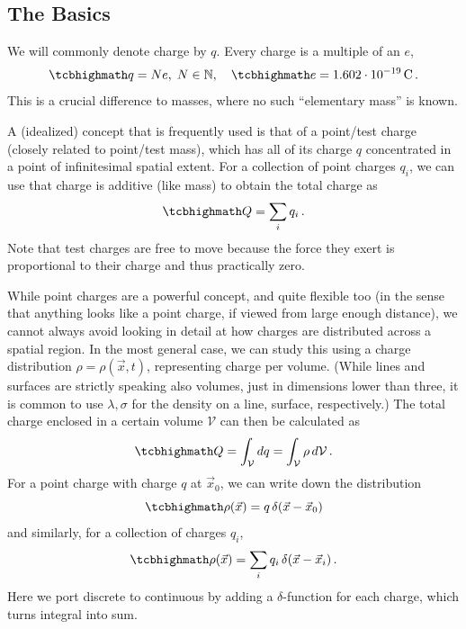 \documentclass[../class_mech_main.tex]{subfiles}
\begin{document}
        \subsection{The Basics}
We will commonly denote charge by $q$. Every charge is a multiple of an  $e$,
\begin{equation}
    \eqbox{
        q = N e
    }, \; N \in \mathbb{N}
    , \quad
    \eqbox{
        e = 1.602 \cdot 10^{-19} \, \unit{\coulomb}
    } \, .
\end{equation}
This is a crucial difference to masses, where no such \enquote{elementary mass} is known.

A (idealized) concept that is frequently used is that of a point/test charge (closely related to point/test mass), which has all of its charge $q$ concentrated in a point of infinitesimal spatial extent. For a collection of point charges $q_i$, we can use that charge is additive (like mass) to obtain the total charge as
\begin{equation}
    \eqbox{
        Q = \sum_i q_i
    } \, .
\end{equation}
Note that test charges are free to move because the force they exert is proportional to their charge and thus practically zero.

While point charges are a powerful concept, and quite flexible too (in the sense that anything looks like a point charge, if viewed from large enough distance), we cannot always avoid looking in detail at how charges are distributed across a spatial region. In the most general case, we can study this using a charge distribution $\rho = \rho(\vec{x}, t)$, representing charge per volume. (While lines and surfaces are strictly speaking also volumes, just in dimensions lower than three, it is common to use $\lambda, \sigma$ for the density on a line, surface, respectively.) The total charge enclosed in a certain volume $\mathcal{V}$ can then be calculated as
\begin{equation}
    \eqbox{
        Q = \int_\mathcal{V} dq = \int_\mathcal{V} \rho \, d\mathcal{V}
    } \, .
\end{equation}
For a point charge with charge $q$ at $\vec{x}_0$, we can write down the distribution
\begin{equation}
    \eqbox{
        \rho(\vec{x}) = q \, \delta(\vec{x} - \vec{x}_0)
    }
\end{equation}
and similarly, for a collection of charges $q_i$,
\begin{equation}
    \eqbox{
        \rho(\vec{x}) = \sum_i q_i \, \delta(\vec{x} - \vec{x}_i)
    } \, .
\end{equation}
Here we port discrete to continuous by adding a $\delta$-function for each charge, which turns integral into sum.\\
\end{document}
